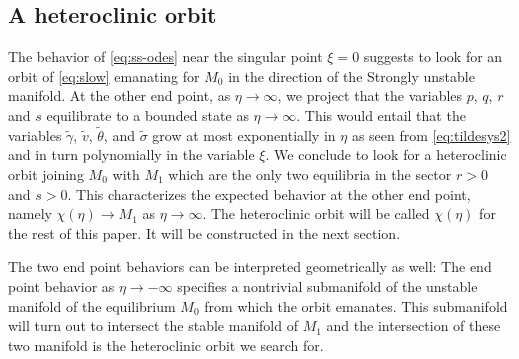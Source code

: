 \documentclass[usletter,11pt]{article}
\def\tg{{\tilde{\gamma}}}
\def\tv{{\tilde{v}}}
\def\tth{{\tilde{\theta}}}
\def\ts{{\tilde{\sigma}}}
\theoremstyle{remark}
\begin{document}
\subsection{A heteroclinic orbit}
The behavior of \eqref{eq:ss-odes} near the singular point  $\xi =0$ suggests to look for an orbit of \eqref{eq:slow} emanating for $M_0$ in the direction of the Strongly unstable manifold.
At the other end point, as $\eta \rightarrow \infty$, we project that the variables $p$, $q$, $r$ and $s$ equilibrate to a bounded state as $\eta \rightarrow \infty$. 
This would entail that the variables $\tg$, $\tv$, $\tth$, and $\ts$ grow at most exponentially in $\eta$ as seen from \eqref{eq:tildesys2} and in turn polynomially in the variable $\xi$.
We conclude to look for a heteroclinic orbit joining $M_0$ with $M_1$ which are the only two equilibria in the sector $r>0$ and $s>0$.
This characterizes the expected behavior at the other end point, namely $\chi(\eta) \rightarrow M_1$ as $\eta \rightarrow \infty$. 
The heteroclinic orbit will be called $\chi(\eta)$ for the rest of this paper. It will be constructed in the next section.

The two end point behaviors can be interpreted geometrically as well: The end point behavior as $\eta \rightarrow -\infty$ specifies a nontrivial submanifold of the unstable manifold  
of the equilibrium  $M_0$ from which the  orbit emanates. This submanifold will turn out to intersect the stable manifold of $M_1$ and the intersection of these two manifold is the heteroclinic orbit we search for. 
\end{document}
